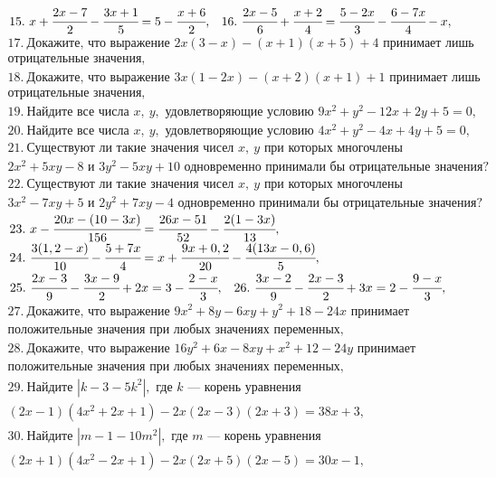 $\begin{array}{ll}
15.\ x+\cfrac{2x-7}{2}-\cfrac{3x+1}{5}=5-\cfrac{x+6}{2},&
16.\ \cfrac{2x-5}{6}+\cfrac{x+2}{4}=\cfrac{5-2x}{3}-\cfrac{6-7x}{4}-x,
\end{array}$\\
$\begin{array}{l}
17.\ \text{Докажите, что выражение }2x(3-x)-(x+1)(x+5)+4
\text{ принимает лишь}\\ \text{отрицательные значения,}\\
18.\ \text{Докажите, что выражение }3x(1-2x)-(x+2)(x+1)+1
\text{ принимает лишь}\\ \text{отрицательные значения,}\\
19.\ \text{Найдите все числа }x,\ y,\text{ удовлетворяющие условию } 9x^2+y^2-12x+2y+5=0,\\
20.\ \text{Найдите все числа }x,\ y,\text{ удовлетворяющие условию } 4x^2+y^2-4x+4y+5=0,\\
21.\ \text{Существуют ли такие значения чисел }x,\ y \text{ при которых многочлены }\\
2x^2+5xy-8\text{ и } 3y^2-5xy+10\text{ одновременно принимали бы отрицательные значения?}\\
22.\ \text{Существуют ли такие значения чисел }x,\ y \text{ при которых многочлены }\\
3x^2-7xy+5\text{ и } 2y^2+7xy-4\text{ одновременно принимали бы отрицательные значения?}
\end{array}$\\
$\begin{array}{ll}
23.\ x-\cfrac{20x-(10-3x)}{156}=\cfrac{26x-51}{52}-\cfrac{2(1-3x)}{13},\\
24.\ \cfrac{3(1,2-x)}{10}-\cfrac{5+7x}{4}=x+\cfrac{9x+0,2}{20}-\cfrac{4(13x-0,6)}{5},\end{array}$\\
$\begin{array}{ll}25.\ \cfrac{2x-3}{9}-\cfrac{3x-9}{2}+2x=3-\cfrac{2-x}{3},&
26.\ \cfrac{3x-2}{9}-\cfrac{2x-3}{2}+3x=2-\cfrac{9-x}{3},
\end{array}$\\
$\begin{array}{l}
27.\ \text{Докажите, что выражение }9x^2+8y-6xy+y^2+18-24x  \text{ принимает}\\
\text{положительные значения при любых значениях переменных,}\\
28.\ \text{Докажите, что выражение }16y^2+6x-8xy+x^2+12-24y  \text{ принимает}\\
\text{положительные значения при любых значениях переменных,}\\
29.\ \text{Найдите } |k-3-5k^2|,\text{ где }k\text{ --- корень уравнения }\\
(2x-1)(4x^2+2x+1)-2x(2x-3)(2x+3)=38x+3,\\
30.\ \text{Найдите } |m-1-10m^2|,\text{ где }m\text{ --- корень уравнения }\\
(2x+1)(4x^2-2x+1)-2x(2x+5)(2x-5)=30x-1,\end{array}$\\
